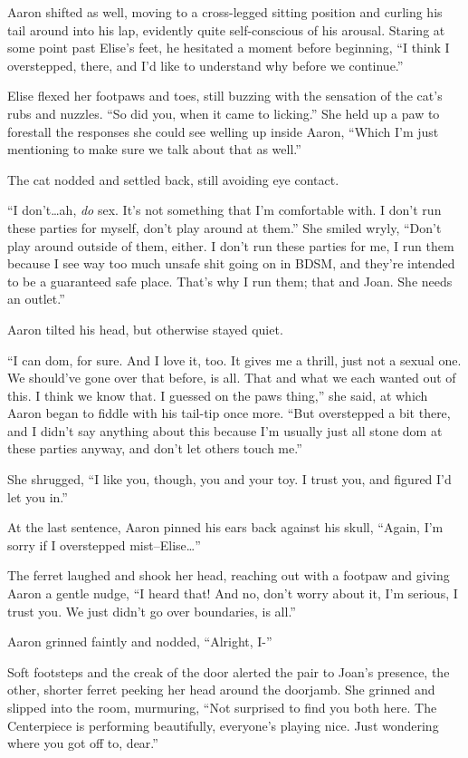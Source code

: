 \documentclass[12pt,letterpaper,oneside]{memoir}
\begin{document}
  Aaron shifted as well, moving to a cross-legged sitting position and curling his tail around into his lap, evidently quite self-conscious of his arousal. Staring at some point past Elise's feet, he hesitated a moment before beginning, ``I think I overstepped, there, and I'd like to understand why before we continue.''

  Elise flexed her footpaws and toes, still buzzing with the sensation of the cat's rubs and nuzzles. ``So did you, when it came to licking.'' She held up a paw to forestall the responses she could see welling up inside Aaron, ``Which I'm just mentioning to make sure we talk about that as well.''

  The cat nodded and settled back, still avoiding eye contact.

  ``I don't\ldots{}ah, \textit{do} sex. It's not something that I'm comfortable with. I don't run these parties for myself, don't play around at them.'' She smiled wryly, ``Don't play around outside of them, either. I don't run these parties for me, I run them because I see way too much unsafe shit going on in BDSM, and they're intended to be a guaranteed safe place.  That's why I run them; that and Joan. She needs an outlet.''

  Aaron tilted his head, but otherwise stayed quiet.

  ``I can dom, for sure. And I love it, too. It gives me a thrill, just not a sexual one. We should've gone over that before, is all. That and what we each wanted out of this. I think we know that. I guessed on the paws thing,'' she said, at which Aaron began to fiddle with his tail-tip once more. ``But overstepped a bit there, and I didn't say anything about this because I'm usually just all stone dom at these parties anyway, and don't let others touch me.''

  She shrugged, ``I like you, though, you and your toy. I trust you, and figured I'd let you in.''

  At the last sentence, Aaron pinned his ears back against his skull, ``Again, I'm sorry if I overstepped mist--Elise\ldots{}''

  The ferret laughed and shook her head, reaching out with a footpaw and giving Aaron a gentle nudge, ``I heard that! And no, don't worry about it, I'm serious, I trust you. We just didn't go over boundaries, is all.''

  Aaron grinned faintly and nodded, ``Alright, I-''

  Soft footsteps and the creak of the door alerted the pair to Joan's presence, the other, shorter ferret peeking her head around the doorjamb.  She grinned and slipped into the room, murmuring, ``Not surprised to find you both here. The Centerpiece is performing beautifully, everyone's playing nice. Just wondering where you got off to, dear.''
\end{document}
